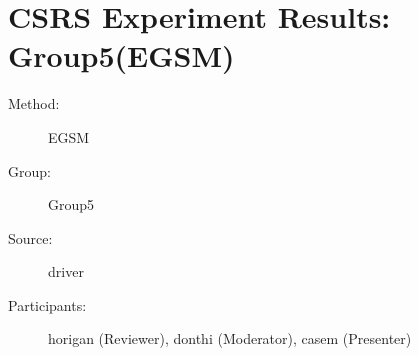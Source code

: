\chapter {CSRS Experiment Results: Group5(EGSM)}
\small

\begin{description}
\item [Method:] EGSM
\item [Group:] Group5
\item [Source:] driver
\item [Participants:] horigan (Reviewer), donthi (Moderator), casem (Presenter)
\end{description}
